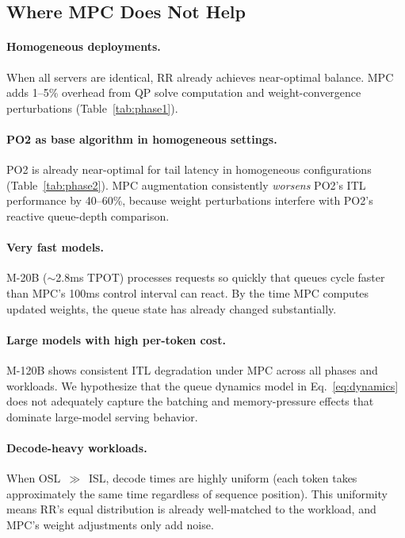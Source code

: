 \documentclass[runningheads]{llncs}
\begin{document}
\subsection{Where MPC Does Not Help}

\paragraph{Homogeneous deployments.} When all servers are identical, RR already achieves near-optimal balance. MPC adds 1--5\% overhead from QP solve computation and weight-convergence perturbations (Table~\ref{tab:phase1}).

\paragraph{PO2 as base algorithm in homogeneous settings.} PO2 is already near-optimal for tail latency in homogeneous configurations (Table~\ref{tab:phase2}). MPC augmentation consistently \textit{worsens} PO2's ITL performance by 40--60\%, because weight perturbations interfere with PO2's reactive queue-depth comparison.

\paragraph{Very fast models.} M-20B (${\sim}$2.8ms TPOT) processes requests so quickly that queues cycle faster than MPC's 100ms control interval can react. By the time MPC computes updated weights, the queue state has already changed substantially.

\paragraph{Large models with high per-token cost.} M-120B shows consistent ITL degradation under MPC across all phases and workloads. We hypothesize that the queue dynamics model in Eq.~\eqref{eq:dynamics} does not adequately capture the batching and memory-pressure effects that dominate large-model serving behavior.

\paragraph{Decode-heavy workloads.} When OSL~$\gg$~ISL, decode times are highly uniform (each token takes approximately the same time regardless of sequence position). This uniformity means RR's equal distribution is already well-matched to the workload, and MPC's weight adjustments only add noise.
\end{document}
